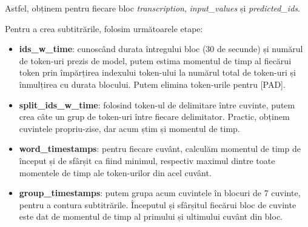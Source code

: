 Astfel, obținem pentru fiecare bloc \textit{transcription}, \textit{input\_values} și \textit{predicted\_ids}.

\par
Pentru a crea subtitrările, folosim următoarele etape:

\begin{itemize}
    \item \textbf{ids\_w\_time}: cunoscând durata întregului bloc (30 de secunde) și numărul de token-uri
    prezis de model, putem estima momentul de timp al fiecărui token prin împărțirea indexului token-ului
    la numărul total de token-uri și înmulțirea cu durata blocului. Putem elimina token-urile pentru [PAD].
    \item \textbf{split\_ids\_w\_time}: folosind token-ul de delimitare între cuvinte, putem crea câte un 
    grup de token-uri între fiecare delimitator. Practic, obținem cuvintele propriu-zise, dar acum știm și
    momentul de timp.
    \item \textbf{word\_timestamps}: pentru fiecare cuvânt, calculăm momentul de timp de început și de sfârșit
    ca fiind minimul, respectiv maximul dintre toate momentele de timp ale token-urilor din acel cuvânt.
    \item \textbf{group\_timestamps}: putem grupa acum cuvintele în blocuri de 7 cuvinte, pentru a contura
    subtitrările. Începutul și sfârșitul fiecărui bloc de cuvinte este dat de momentul de timp al primului
    și ultimului cuvânt din bloc.
\end{itemize}

